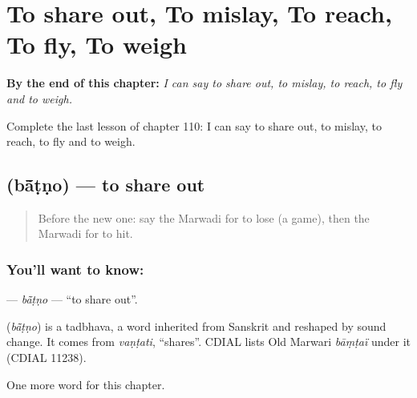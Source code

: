 
\chapter{To share out, To mislay, To reach, To fly, To weigh}
\label{ch:mw-to-share-out-to-mislay-to-reach-to-fly-to-weigh}

\begin{chapteropening}
\textbf{By the end of this chapter:} \emph{I can say to share out, to mislay, to reach, to fly and to weigh.}

Complete the last lesson of chapter 110: I can say to share out, to mislay, to reach, to fly and to weigh.
\end{chapteropening}

\section[\texorpdfstring{\mw{बांटणो} (bā̃ṭṇo)}{बांटणो (bā̃ṭṇo)}]{ (bā̃ṭṇo) — to share out}

\label{lesson:MW-C110-batno}



\begin{quote}
Before the new one: say the Marwadi for to lose (a game), then the Marwadi for to hit.
\end{quote}

\subsection*{You'll want to know: }
\textbf{} — \emph{bā̃ṭṇo} — \textquotedblleft{}to share out\textquotedblright{}.

\begin{cousinweb}
\textbf{} (\emph{bā̃ṭṇo}) is a tadbhava, a word inherited from Sanskrit and reshaped by sound change. It comes from \emph{vaṇṭati}, \textquotedblleft{}shares\textquotedblright{}. CDIAL lists Old Marwari \emph{bāṃṭaï} under it (CDIAL 11238).
\end{cousinweb}

\begin{grammarlens}[title={What you've built}]
One more word for this chapter.
\end{grammarlens}

